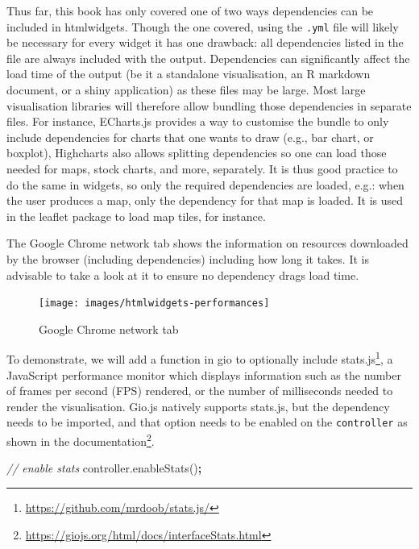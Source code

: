 \documentclass[
  10pt,
]{krantz}
\makeatletter
\newenvironment{Shaded}{\begin{snugshade}}{\end{snugshade}}
\newcommand{\AttributeTok}[1]{\textcolor[rgb]{0.61,0.61,0.61}{#1}}
\newcommand{\CommentTok}[1]{\textcolor[rgb]{0.37,0.37,0.37}{\textit{#1}}}
\newcommand{\NormalTok}[1]{#1}
\newcommand{\OperatorTok}[1]{\textcolor[rgb]{0.43,0.43,0.43}{\textbf{#1}}}
\newcommand{\VariableTok}[1]{\textcolor[rgb]{0,0,0}{#1}}
\renewcommand{\href}[2]{#2\footnote{\url{#1}}}
\newenvironment{kframe}{%
\medskip{}
\setlength{\fboxsep}{.8em}
 \def\at@end@of@kframe{}%
 \ifinner\ifhmode%
  \def\at@end@of@kframe{\end{minipage}}%
  \begin{minipage}{\columnwidth}%
 \fi\fi%
 \def\FrameCommand##1{\hskip\@totalleftmargin \hskip-\fboxsep
 \colorbox{shadecolor}{##1}\hskip-\fboxsep
     \hskip-\linewidth \hskip-\@totalleftmargin \hskip\columnwidth}%
 \MakeFramed {\advance\hsize-\width
   \@totalleftmargin\z@ \linewidth\hsize
   \@setminipage}}%
 {\par\unskip\endMakeFramed%
 \at@end@of@kframe}
\renewenvironment{Shaded}{\begin{kframe}}{\end{kframe}}
\makeatother
\begin{document}
Thus far, this book has only covered one of two ways dependencies can be included in htmlwidgets. Though the one covered, using the \texttt{.yml} file will likely be necessary for every widget it has one drawback: all dependencies listed in the file are always included with the output. Dependencies can significantly affect the load time of the output (be it a standalone visualisation, an R markdown document, or a shiny application) as these files may be large. Most large visualisation libraries will therefore allow bundling those dependencies in separate files. For instance, ECharts.js provides a way to customise the bundle to only include dependencies for charts that one wants to draw (e.g., bar chart, or boxplot), Highcharts also allows splitting dependencies so one can load those needed for maps, stock charts, and more, separately. It is thus good practice to do the same in widgets, so only the required dependencies are loaded, e.g.: when the user produces a map, only the dependency for that map is loaded. It is used in the leaflet package to load map tiles, for instance.

The Google Chrome network tab shows the information on resources downloaded by the browser (including dependencies) including how long it takes. It is advisable to take a look at it to ensure no dependency drags load time.

\begin{figure}[H]

{\centering \texttt{[image: images/htmlwidgets-performances]} 

}

\caption{Google Chrome network tab}\label{fig:htmlwidgets-performances}
\end{figure}

To demonstrate, we will add a function in gio to optionally include \href{https://github.com/mrdoob/stats.js/}{stats.js}, a JavaScript performance monitor which displays information such as the number of frames per second (FPS) rendered, or the number of milliseconds needed to render the visualisation. Gio.js natively supports stats.js, but the dependency needs to be imported, and that option needs to be enabled on the \texttt{controller} as shown in the \href{https://giojs.org/html/docs/interfaceStats.html}{documentation}.

\begin{Shaded}
\begin{Highlighting}[]
\CommentTok{// enable stats}
\VariableTok{controller}\NormalTok{.}\AttributeTok{enableStats}\NormalTok{()}\OperatorTok{;}
\end{Highlighting}
\end{Shaded}
\end{document}
